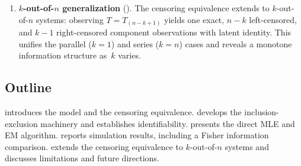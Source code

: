 \begin{enumerate}
  \item \textbf{$k$-out-of-$n$ generalization}
    ().
    The censoring equivalence extends to $k$-out-of-$n$ systems:
    observing $T = T_{(n-k+1)}$ yields one exact, $n-k$ left-censored,
    and $k-1$ right-censored component observations with latent identity.
    This unifies the parallel ($k=1$) and series ($k=n$) cases and
    reveals a monotone information structure as~$k$ varies.
\end{enumerate}

\subsection*{Outline}

 introduces the model and the censoring equivalence.
 develops the inclusion-exclusion machinery and
establishes identifiability.
 presents the direct MLE and EM algorithm.
 reports simulation results, including a Fisher
information comparison.
 extends the censoring equivalence to
$k$-out-of-$n$ systems and discusses limitations and future directions.
